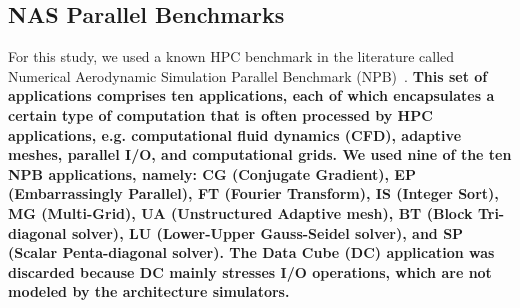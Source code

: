 \documentclass[AMA,final,STIX1COL]{WileyNJD-v2}
\newcommand\new[1]{{\color{red}\textbf{#1}}}
\begin{document}
\begin{table}[]
    \centering
    \footnotesize
    \caption{Prefetcher algorithms.}
    \label{prefetches}
\end{table}

 

\subsection{NAS Parallel Benchmarks}
\label{subsec:nas}


For this study, we used a known HPC benchmark in the literature called Numerical Aerodynamic Simulation Parallel Benchmark (NPB)~\cite{jin1999openmp}. 
\new{This set of applications comprises ten applications, each of which encapsulates a certain type of computation that is often processed by HPC applications, e.g. computational fluid dynamics (CFD), adaptive meshes, parallel I/O, and computational grids.
We used nine of the ten NPB applications, namely: CG (Conjugate Gradient), EP (Embarrassingly Parallel), FT (Fourier Transform), IS (Integer Sort), MG (Multi-Grid), UA (Unstructured Adaptive mesh), BT (Block Tri-diagonal solver), LU (Lower-Upper Gauss-Seidel solver), and SP (Scalar Penta-diagonal solver).
The Data Cube (DC) application was discarded because DC mainly stresses I/O operations, which are not modeled by the architecture simulators.}
\end{document}
